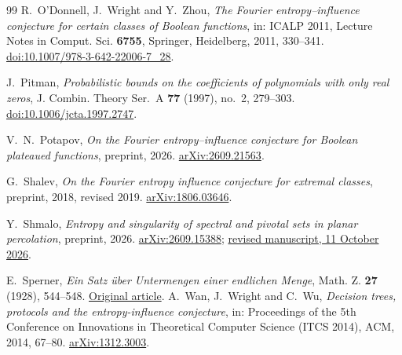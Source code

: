 \documentclass[11pt]{amsart}
\theoremstyle{definition}
\theoremstyle{remark}
\begin{document}
\begin{thebibliography}{99}
R.~O'Donnell, J.~Wright and Y.~Zhou,
\emph{The Fourier entropy--influence conjecture for certain classes of Boolean functions},
in: ICALP 2011, Lecture Notes in Comput. Sci. \textbf{6755}, Springer, Heidelberg, 2011, 330--341.
\href{https://doi.org/10.1007/978-3-642-22006-7_28}{doi:10.1007/978-3-642-22006-7\_28}.

J.~Pitman,
\emph{Probabilistic bounds on the coefficients of polynomials with only real zeros},
J. Combin. Theory Ser.~A \textbf{77} (1997), no.~2, 279--303.
\href{https://doi.org/10.1006/jcta.1997.2747}{doi:10.1006/jcta.1997.2747}.

V.~N.~Potapov,
\emph{On the Fourier entropy--influence conjecture for Boolean plateaued functions},
preprint, 2026.
\href{https://arxiv.org/abs/2609.21563}{arXiv:2609.21563}.

G.~Shalev,
\emph{On the Fourier entropy influence conjecture for extremal classes},
preprint, 2018, revised 2019.
\href{https://arxiv.org/abs/1806.03646}{arXiv:1806.03646}.

Y.~Shmalo,
\emph{Entropy and singularity of spectral and pivotal sets in planar percolation},
preprint, 2026.
\href{https://arxiv.org/abs/2609.15388}{arXiv:2609.15388};
\href{https://github.com/yspennstate/percolation-crossing-entropy}{revised manuscript, 11 October 2026}.

E.~Sperner,
\emph{Ein Satz \"uber Untermengen einer endlichen Menge},
Math. Z. \textbf{27} (1928), 544--548.
\href{https://eudml.org/doc/167993}{Original article}.
A.~Wan, J.~Wright and C.~Wu,
\emph{Decision trees, protocols and the entropy-influence conjecture},
in: Proceedings of the 5th Conference on Innovations in Theoretical
Computer Science (ITCS 2014), ACM, 2014, 67--80.
\href{https://arxiv.org/abs/1312.3003}{arXiv:1312.3003}.
\end{thebibliography}
\end{document}
